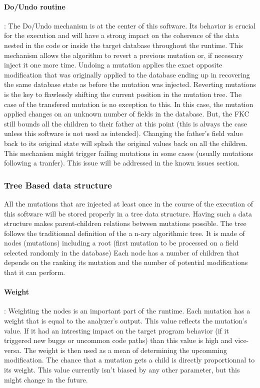 \documentclass{article}
\begin{document}
				\paragraph{Do/Undo routine} :
The Do/Undo mechanism is at the center of this software. Its behavior is crucial for the execution and will have a strong impact on the coherence of the data nested in the code or inside the target database throughout the runtime.
This mechanism allows the algorithm to revert a previous mutation or, if necessary inject it one more time. 
Undoing a mutation applies the exact opposite modification that was originally applied to the database ending up in recovering the same database state as before the mutation was injected.
Reverting mutations is the key to flawlessly shifting the current position in the mutation tree.
The case of the transfered mutation is no exception to this. In this case, the mutation applied changes on an unknown number of fields in the database. But, the FKC still bounds all the children to their father at this point (this is always the case unless this software is not used as intended).  
Changing the father's field value back to its original state will splash the original values back on all the children.
This mechanism might trigger failing mutations in some cases (usually mutations following a tranfer). This issue will be addressed in the known issues section. 
			\subsubsection{Tree Based data structure}
All the mutations that are injected at least once in the course of the execution of this software will be stored properly in a tree data structure. Having such a data structure makes parent-children relations between mutations possible. The tree follows the traditionnal definition of the a n-ary algorithmic tree.
It is made of nodes (mutations) including a root (first mutation to be processed on a field selected randomly in the database)  
Each node has a number of children that depends on the ranking its mutation and the number of potential modifications that it can perform.
				\paragraph{Weight} :
Weighting the nodes is an important part of the runtime. Each mutation has a weight that is equal to the analyzer's output. This value reflects the mutation's value. If it had an intresting impact on the target program behavior (if it triggered new buggs or uncommon code paths) than this value is high and vice-versa. The weight is then used as a mean of determining the upcomming modification. The chance that a mutation gets a child is directly proportionnal to its weight.
This value currently isn't biased by any other parameter, but this might change in the future.  
\end{document}
